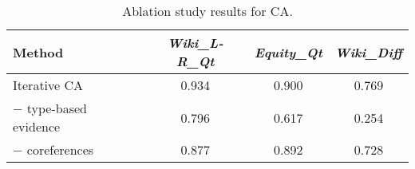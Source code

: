 

\begin{table}[t]
	\centering
		\caption{Ablation study results for CA.}
	\label{tab:ablation_CA}
	\vspace{\tsq}
		\begin{tabular}{l|ccc}
			    \hline
	    Method &\textit{Wiki\_L-R\_Qt} & \textit{Equity\_Qt} & \textit{Wiki\_Diff}\\ 
			    \hline
			    Iterative CA & 0.934 & 0.900 & 0.769\\ 
			    \hline
		 {\hspace{0.25em}$-$ type-based evidence} & 0.796 & 0.617 & 0.254 \\
 		 {\hspace{0.25em}$-$ coreferences} & 0.877  & 0.892 & 0.728 \\
			    \hline
		\end{tabular}
\end{table}
